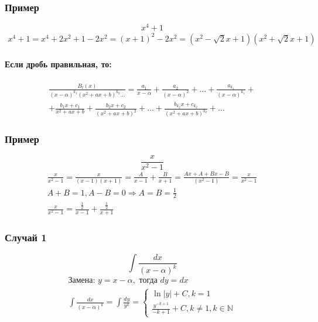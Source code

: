 \documentclass{article}
\begin{document}
\subsubsection{Пример}
\[
    x^4 + 1
\]
\begin{gather*}
    x^4 + 1 = x^4 + 2x^2 + 1 - 2x^2 = (x + 1)^2 - 2x^2 = (x^2 - \sqrt{2}x + 1)(x^2 + \sqrt{2}x + 1)
\end{gather*}

\paragraph{Если дробь правильная, то:}
\begin{gather*}
    \frac{B_l(x)}{(x - \alpha)^{k_1} (x^2 + ax + b)^{k_2} \dots} =
    \frac{a_1}{x - \alpha} + \frac{a_2}{(x - \alpha)^2} + \dots + \frac{a_{k_1}}{(x - \alpha)^{k_1}} + \\
    + \frac{b_1x + c_1}{x^2 + ax + b} + \frac{b_2x + c_2}{(x^2 + ax + b)^2} + \dots + \frac{b_{k_2}x + c_{k_2}}{(x^2 + ax + b)^{k_2}} + \dots
\end{gather*}

\subsubsection{Пример}
\[
    \frac{x}{x^2 - 1}
\]
\begin{gather*}
    \frac{x}{x^2 - 1} = \frac{x}{(x - 1)(x + 1)} = \frac{A}{x - 1} + \frac{B}{x + 1} = \frac{Ax + A + Bx - B}{(x^2 - 1)} = \frac{x}{x^2 - 1} \\
    A + B = 1, A - B = 0 \Rightarrow A = B = \frac{1}{2} \\
    \frac{x}{x^2 - 1} = \frac{\frac{1}{2}}{x - 1} + \frac{\frac{1}{2}}{x + 1}
\end{gather*}

\subsubsection{Случай 1}
\[
    \int \frac{dx}{(x - \alpha)^k}
\]
\begin{gather*}
    \text{Замена: } y = x - \alpha, \text{ тогда } dy = dx \\
    \int \frac{dx}{(x - \alpha)^k} = \int \frac{dy}{y^k} = \begin{cases}
        \ln |y| + C, k = 1 \\
        \frac{y^{-k + 1}}{-k + 1} + C, k \neq 1, k \in \mathbb{N}
    \end{cases}
\end{gather*}
\end{document}
